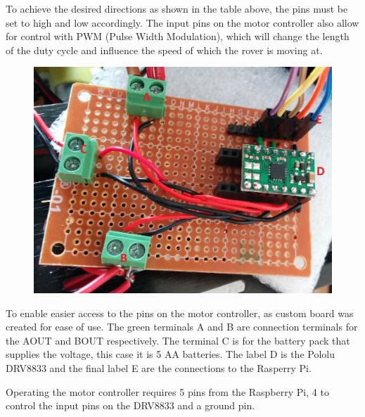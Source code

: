 To achieve the desired directions as shown in the table above, the pins must be set to high and low accordingly. The input pins on the motor controller also allow for control with PWM (Pulse Width Modulation), which will change the length of the duty cycle and influence the speed of which the rover is moving at\cite{DRV8833}. %

\begin{figure}[H]
	\centering
	\includegraphics[width=.5\linewidth]{images/labelled.jpg}
\end{figure}

To enable easier access to the pins on the motor controller, as custom board was created for ease of use. The green terminals A and B are connection terminals for the AOUT and BOUT respectively. The terminal C is for the battery pack that supplies the voltage, this case it is 5 AA batteries. The label D is the Pololu DRV8833 and the final label E are the connections to the Rasperry Pi. 

Operating the motor controller requires 5 pins from the Raspberry Pi, 4 to control the input pins on the DRV8833 and a ground pin.